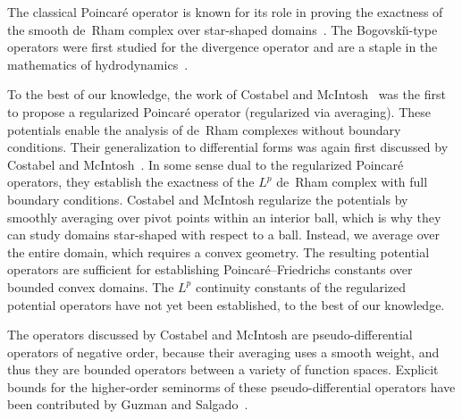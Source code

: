 \begin{remark} \label{remark:reg_Poinc_Bog}
    The classical Poincar\'e operator is known for its role in proving the exactness of the smooth de~Rham complex over star-shaped domains~\cite{lee2012smooth}.
	The Bogovski\u{\i}-type operators were first studied for the divergence operator and are a staple in the mathematics of hydrodynamics~\cite{bogovskii1979solution}.
    
    To the best of our knowledge, the work of Costabel and McIntosh~\cite{costabel2010bogovskiui} was the first to propose a regularized Poincar\'e operator (regularized via averaging).
    These potentials enable the analysis of de~Rham complexes without boundary conditions.
    Their generalization to differential forms was again first discussed by Costabel and McIntosh~\cite{costabel2010bogovskiui}. 
    In some sense dual to the regularized Poincar\'e operators, they establish the exactness of the $L^{p}$ de~Rham complex with full boundary conditions.
    Costabel and McIntosh regularize the potentials by smoothly averaging over pivot points within an interior ball, 
    which is why they can study domains star-shaped with respect to a ball. 
    Instead, we average over the entire domain, which requires a convex geometry. 
    The resulting potential operators are sufficient for establishing Poincar\'e--Friedrichs constants over bounded convex domains. 
    The $L^{p}$ continuity constants of the regularized potential operators have not yet been established, to the best of our knowledge.
    
    The operators discussed by Costabel and McIntosh are pseudo-differential operators of negative order, 
    because their averaging uses a smooth weight, and thus they are bounded operators between a variety of function spaces. 
    Explicit bounds for the higher-order seminorms of these pseudo-differential operators 
    have been contributed by Guzman and Salgado~\cite{guzman2021estimation}. %
    

\end{remark}
